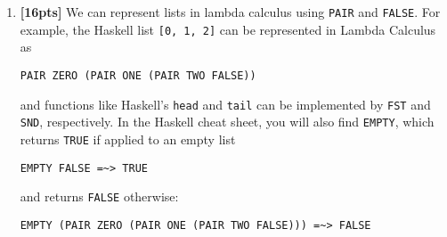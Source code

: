 \documentclass[paper=letter, fontsize=13pt]{article} %
\numberwithin{equation}{section} %
\newif\ifshowanswers\showanswersfalse
\begin{document}
\begin{enumerate}
\begin{enumerate}[label=(\Alph*)]
\item 
\verb|(\z x y -> x y (z y)) (\a -> a (\b c -> c) (\d e -> d)) (\f g -> g) (\h i -> i)|
\ifshowanswers
\begin{itemize}
\item \verb|(\x y -> x y ((\a -> a (\b c -> c) (\d e -> d)) y)) (\f g -> g) (\h i -> i)|
\item \verb|(\y -> (\f g -> g) y ((\a -> a (\b c -> c) (\d e -> d)) y)) (\h i -> i)|
\item \verb|((\f g -> g) (\h i -> i) ((\a -> a (\b c -> c) (\d e -> d)) (\h i -> i)))|
\item \verb|((\g -> g) ((\a -> a (\b c -> c) (\d e -> d)) (\h i -> i)))|
\item \verb|(\h i -> i) (\b c -> c) (\d e -> d)|
\item \verb|(\i -> i) (\d e -> d)|
\item \verb|(\d e -> d)|
\end{itemize}

Rubric:
\begin{itemize}
\item 0 pts : no attempt or nothing correct.
\item 1 pts : anything correct (e.g., one reduction)
\item 2-5 pts : more than one thing correct (e.g., two reductions), few things incorrect
\item 6 pts : almost correct, but one smallish error
\item 7 pts : completely correct
\end{itemize}
\else
\bigskip
\bigskip
\bigskip
\bigskip
\bigskip
\bigskip
\bigskip
\bigskip
\bigskip
\bigskip
\bigskip
\bigskip
\bigskip
\bigskip
\bigskip
\bigskip
\fi
\end{enumerate}
\newpage

\item \textbf{[16pts]}  
We can represent lists in lambda calculus using \texttt{PAIR} and \texttt{FALSE}.
For example, the Haskell list \texttt{[0, 1, 2]} can be represented in Lambda Calculus
as 
\begin{verbatim}
PAIR ZERO (PAIR ONE (PAIR TWO FALSE))
\end{verbatim}
and functions like Haskell's \texttt{head} and \texttt{tail} can be implemented by \texttt{FST} 
and \texttt{SND}, respectively. In the Haskell cheat sheet, you will also find \texttt{EMPTY}, 
which returns \texttt{TRUE} if applied to an empty list 
\begin{verbatim}
EMPTY FALSE =~> TRUE
\end{verbatim}
and returns \texttt{FALSE} otherwise:
\begin{verbatim}
EMPTY (PAIR ZERO (PAIR ONE (PAIR TWO FALSE))) =~> FALSE
\end{verbatim}


\end{enumerate}
\end{document}
